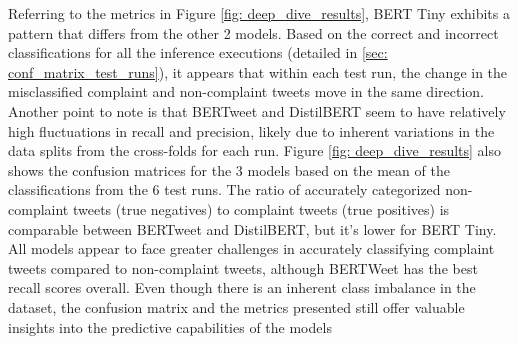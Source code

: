 Referring to the metrics in Figure \ref{fig: deep_dive_results}, BERT Tiny exhibits a pattern that differs from the other 2 models. Based on the correct and incorrect classifications for all the inference executions (detailed in \ref{sec: conf_matrix_test_runs}), it appears that within each test run, the change in the misclassified complaint and non-complaint tweets move in the same direction. Another point to note is that BERTweet and DistilBERT seem to have relatively high fluctuations in recall and precision, likely due to inherent variations in the data splits from the cross-folds for each run. Figure \ref{fig: deep_dive_results} also shows the confusion matrices for the 3 models based on the mean of the classifications from the 6 test runs. The ratio of accurately categorized non-complaint tweets (true negatives) to complaint tweets (true positives) is comparable between BERTweet and DistilBERT, but it's lower for BERT Tiny. All models appear to face greater challenges in accurately classifying complaint tweets compared to non-complaint tweets, although BERTWeet has the best recall scores overall. Even though there is an inherent class imbalance in the dataset, the confusion matrix and the metrics presented still offer valuable insights into the predictive capabilities of the models\\


